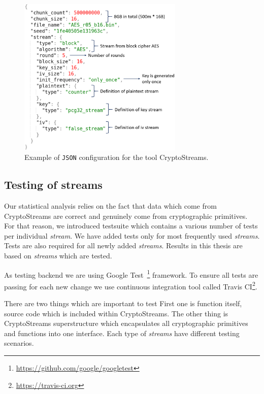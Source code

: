 \documentclass[
    digital,    %
    oneside,    %
    color,
    11pt,
    nocover,
    notable,
    nolof,
    nolot,
    final
]{fithesis3}
\renewcommand\_{\textunderscore\allowbreak}
\begin{document}
\begin{figure}[h]
	\centering
	\includegraphics[width=0.7\textwidth]{./images/pictures/config.png}
	\caption{Example of \texttt{JSON} configuration for the tool CryptoStreams.}
	\label{fig:json-example}
\end{figure}


\subsection{Testing of streams}

Our statistical analysis relies on the fact that data which come from CryptoStreams are correct and genuinely come from cryptographic primitives. For that reason, we introduced testsuite which contains a various number of tests per individual \textit{stream}. We have added tests only for most frequently used \textit{streams}. Tests are also required for all newly added \textit{streams}. Results in this thesis are based on \textit{streams} which are tested.

As testing backend we are using Google Test~\footnote{\url{https://github.com/google/googletest}} framework. To ensure all tests are passing for each new change we use continuous integration tool called Travis CI\footnote{\url{https://travis-ci.org}}.

There are two things which are important to test First one is function itself, source code which is included within CryptoStreams. The other thing is CryptoStreams superstructure which encapsulates all cryptographic primitives and functions into one interface. Each type of \textit{streams} have different testing scenarios.
\end{document}
